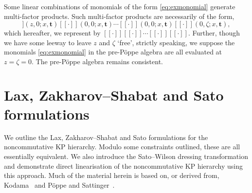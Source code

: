 \documentclass[5p,twocolumn]{elsarticle}
\newcommand*{\lb}{[\![}
\newcommand*{\rb}{]\!]}
\newcommand*{\tbf}{\boldsymbol{t}}
\begin{document}
%
\begin{remark}\label{rmk:multifactor}
Some linear combinations of monomials of the form \eqref{eq:exmonomial} generate multi-factor products. Such multi-factor products are necessarily of the form,
\begin{equation*}
\lb\cdot\rb(z,0;x,\tbf)\lb\cdot\rb(0,0;x,\tbf)\cdots\lb\cdot\rb(0,0;x,\tbf)\lb\cdot\rb(0,\zeta;x,\tbf),
\end{equation*}
which hereafter, we represent by $\lb\cdot\rb\lb\cdot\rb\cdots\lb\cdot\rb\lb\cdot\rb$.
Further, though we have some leeway to leave $z$ and $\zeta$ `free', strictly speaking, we suppose the monomials \eqref{eq:exmonomial} in the pre-P\"oppe algebra are all evaluated at $z=\zeta=0$.
The pre-P\"oppe algebra remains consistent.
\end{remark}
%



\section{Lax, Zakharov--Shabat and Sato formulations}\label{sec:Satoindirect}
We outline the Lax, Zakharov--Shabat and Sato formulations for the noncommutative KP hierarchy. Modulo some constraints outlined, these are all essentially equivalent.
We also introduce the Sato--Wilson dressing transformation and demonstrate direct linearisation of the noncommutative KP hierarchy using this approach.
Much of the material herein is based on, or derived from, Kodama~\cite[Ch.~2]{Kodama} and P\"oppe and Sattinger~\cite{PoppeSattinger}.
\end{document}
